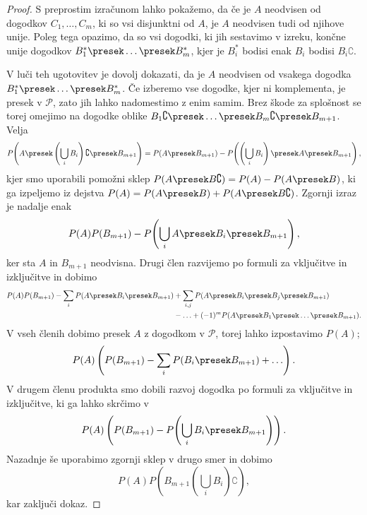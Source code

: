 \begin{proof}
  S preprostim izračunom lahko pokažemo, da če je $A$ neodvisen od dogodkov
  $C_1, \ldots, C_m$, ki so vsi disjunktni od $A$, je $A$ neodvisen tudi od
  njihove unije.
  Poleg tega opazimo, da so vsi dogodki, ki jih sestavimo v izreku, končne unije
  dogodkov $B_1^* \presek \ldots \presek B_m^*$, kjer je $B_i^*$ bodisi enak
  $B_i$ bodisi $B_i\complement$.

  V luči teh ugotovitev je dovolj dokazati, da je $A$ neodvisen od vsakega
  dogodka $B_1^* \presek \ldots \presek B_m^*$.
  Če izberemo vse dogodke, kjer ni komplementa, je presek v $\mathcal{P}$, zato
  jih lahko nadomestimo z enim samim.
  Brez škode za splošnost se torej omejimo na dogodke oblike $B_1\complement
  \presek \ldots \presek B_m\complement \presek B_{m+1}$.
  Velja
  \[
    P\!\left(A \presek \left( \bigcup_i B_i \right)\complement \presek B_{m+1}\right)
    = P(A \presek B_{m+1}) - P\!\left(\left( \bigcup_i B_i \right) \presek A \presek
    B_{m+1}\right),
  \]
  kjer smo uporabili pomožni sklep $P(A \presek B\complement) = P(A) - P(A
  \presek B)$, ki ga izpeljemo iz dejstva $P(A) = P(A \presek B) + P(A \presek
  B\complement)$.
  Zgornji izraz je nadalje enak
  \[
    P(A) P(B_{m+1}) - P\!\left( \bigcup_i A \presek B_i \presek B_{m+1} \right),
  \]
  ker sta $A$ in $B_{m+1}$ neodvisna.
  Drugi člen razvijemo po formuli za vključitve in izključitve in dobimo
  \begin{align*}
    P(A) P(B_{m+1}) - \sum_i P(A \presek B_i \presek B_{m+1})
	&+ \sum_{i,j} P(A \presek B_i \presek B_j \presek B_{m+1}) \\
	&- \ldots
	+ (-1)^m P(A \presek B_1 \presek \ldots \presek B_{m+1}).
  \end{align*}
  V vseh členih dobimo presek $A$ z dogodkom v $\mathcal{P}$, torej lahko
  izpostavimo $P(A)$;
  \[
    P(A) \left( P(B_{m+1}) - \sum_i P(B_i \presek B_{m+1}) + \ldots \right).
  \]
  V drugem členu produkta smo dobili razvoj dogodka po formuli za vključitve in
  izključitve, ki ga lahko skrčimo v
  \[
    P(A) \left( P(B_{m+1}) - P\!\left( \bigcup_i B_i \presek B_{m+1} \right) \right).
  \]
  Nazadnje še uporabimo zgornji sklep v drugo smer in dobimo
  \[
    P(A) P\!\left( B_{m+1} \left( \bigcup_i B_i \right)\complement \right),
  \]
  kar zaključi dokaz.
\end{proof}

